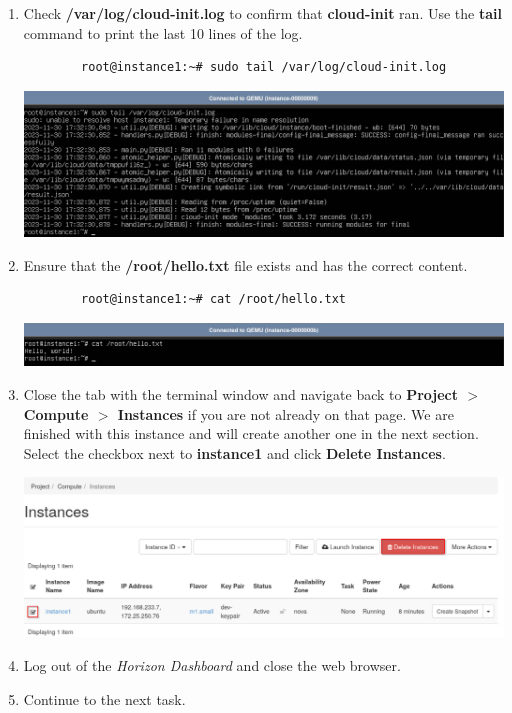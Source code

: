 \documentclass[letterpaper, 12pt]{article}
\begin{document}
\begin{enumerate}
    \item Check \textbf{/var/log/cloud-init.log} to confirm that \textbf{cloud-init} ran. Use the \textbf{tail}
    command to print the last 10 lines of the log.
    \begin{lstlisting}
        root@instance1:~# sudo tail /var/log/cloud-init.log
    \end{lstlisting}

    \begin{center}
        \includegraphics[width=\linewidth]{images/part2/step14.png}
    \end{center}

    \item Ensure that the \textbf{/root/hello.txt} file exists and has the correct content.
    \begin{lstlisting}
        root@instance1:~# cat /root/hello.txt
    \end{lstlisting}

    \begin{center}
        \includegraphics[width=\linewidth]{images/part2/step15.png}
    \end{center}

    \item Close the tab with the terminal window and navigate back to \textbf{Project $>$ Compute $>$ Instances} if you
    are not already on that page. We are finished with this instance and will create another one in the next section.
    Select the checkbox next to \textbf{instance1} and click \textbf{Delete Instances}.

    \begin{center}
        \includegraphics[width=\linewidth]{images/part2/step16.png}
    \end{center}

    \item Log out of the \textit{Horizon Dashboard} and close the web browser.

    \item Continue to the next task.

\end{enumerate}
\end{document}
